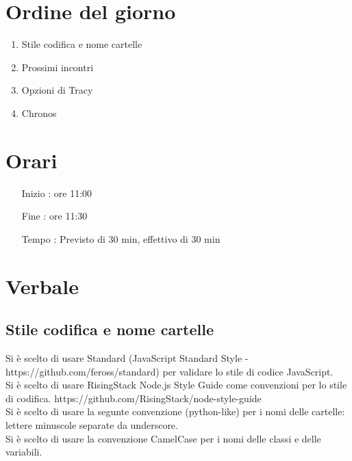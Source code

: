 \documentclass[11pt]{meetingmins}
\begin{document}
\maketitle

\section{Ordine del giorno}

\begin{enumerate}

  \item Stile codifica e nome cartelle
  \item Prossimi incontri
  \item Opzioni di Tracy
  \item Chronos

\end{enumerate}

\section{Orari}

\begin{itemize}
\item[Inizio]: ore 11:00
\item[Fine]: ore 11:30
\item[Tempo]: Previsto di 30 min, effettivo di 30 min

\end{itemize}

\section{Verbale}

\subsection{Stile codifica e nome cartelle}

Si \`{e} scelto di usare Standard (JavaScript Standard Style - https://github.com/feross/standard) per validare lo stile di codice JavaScript.\\
Si \`{e} scelto di usare RisingStack Node.js Style Guide come convenzioni per lo stile di codifica. https://github.com/RisingStack/node-style-guide\\

Si \`{e} scelto di usare la segunte convenzione (python-like) per i nomi delle cartelle: lettere minuscole separate da underscore.\\
Si \`{e} scelto di usare la convenzione CamelCase per i nomi delle classi e delle variabili.
\end{document}
